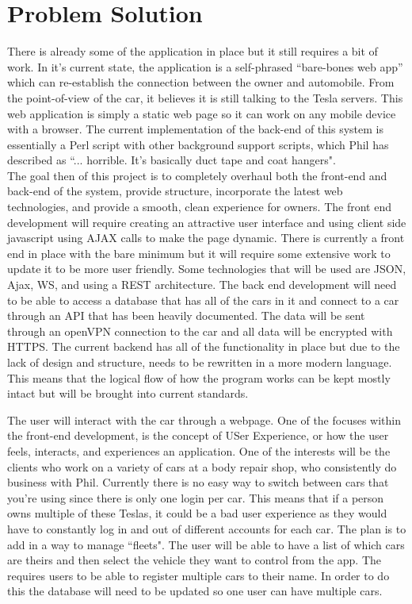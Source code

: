 \documentclass[onecolumn, draftclsnofoot,10pt, compsoc]{IEEEtran}
\begin{document}
\section{Problem Solution}
There is already some of the application in place but it still requires a bit of work.
In it's current state, the application is a self-phrased “bare-bones web app” which can re-establish the connection between the owner and automobile. 
From the point-of-view of the car, it believes it is still talking to the Tesla servers. 
This web application is simply a static web page so it can work on any mobile device with a browser.
The current implementation of the back-end of this system is essentially a Perl script with other background support scripts, which Phil has described as ``... horrible. It’s basically duct tape and coat hangers".
\\
The goal then of this project is to completely overhaul both the front-end and back-end of the system, provide structure, incorporate the latest web technologies, and provide a smooth, clean experience for owners.
The front end development will require creating an attractive user interface and using client side javascript using AJAX calls to make the page dynamic.
There is currently a front end in place with the bare minimum but it will require some extensive work to update it to be more user friendly.
Some technologies that will be used are JSON, Ajax, WS, and using a REST architecture.
The back end development will need to be able to access a database that has all of the cars in it and connect to a car through an API that has been heavily documented.\cite{2}
The data will be sent through an openVPN connection to the car and all data will be encrypted with HTTPS. 
The current backend has all of the functionality in place but due to the lack of design and structure, needs to be rewritten in a more modern language.
This means that the logical flow of how the program works can be kept mostly intact but will be brought into current standards.

The user will interact with the car through a webpage.
One of the focuses within the front-end development, is the concept of USer Experience, or how the user feels, interacts, and experiences an application.
One of the interests will be the clients who work on a variety of cars at a body repair shop, who consistently do business with Phil. 
Currently there is no easy way to switch between cars that you’re using since there is only one login per car.
This means that if a person owns multiple of these Teslas, it could be a bad user experience as they would have to constantly log in and out of different accounts for each car.
The plan is to add in a way to manage ``fleets". The user will be able to have a list of which cars are theirs and then select the vehicle they want to control from the app.
The requires users to be able to register multiple cars to their name. In order to do this the database will need to be updated so one user can have multiple cars.
\end{document}

